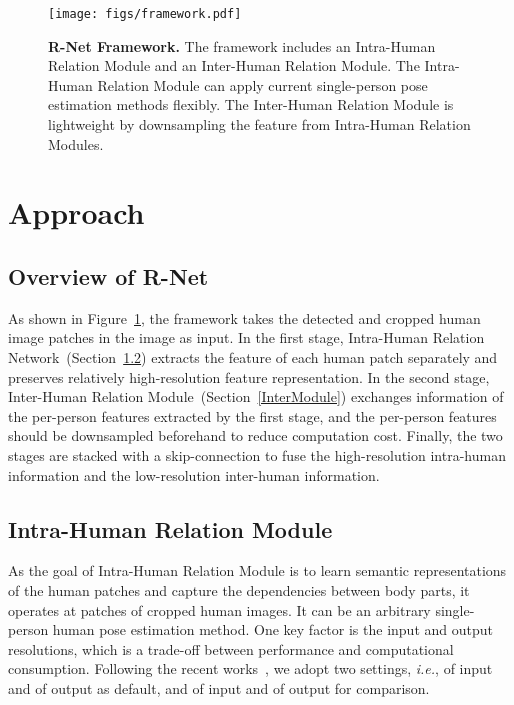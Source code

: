 \documentclass{article}
\begin{document}
\begin{figure}[t]
 \centering
    \texttt{[image: figs/framework.pdf]}
  \caption{\textbf{R-Net Framework.} The framework includes an Intra-Human Relation Module and an Inter-Human Relation Module. The Intra-Human Relation Module can apply current single-person pose estimation methods flexibly. The Inter-Human Relation Module is lightweight by downsampling the feature from Intra-Human Relation Modules.} 
  \label{framework}
\end{figure}



\section{Approach}


\subsection{Overview of R-Net}

As shown in Figure~\ref{framework}, the framework takes the detected and cropped human image patches in the image as input. In the first stage, Intra-Human Relation Network~(Section~\ref{IntraModule}) extracts the feature of each human patch separately and preserves relatively high-resolution feature representation. In the second stage, Inter-Human Relation Module~(Section~\ref{InterModule}) exchanges information of the per-person features extracted by the first stage, and the per-person features should be downsampled beforehand to reduce computation cost. Finally, the two stages are stacked with a skip-connection to fuse the high-resolution intra-human information and the low-resolution inter-human information.

\subsection{Intra-Human Relation Module}\label{IntraModule}
As the goal of Intra-Human Relation Module is to learn semantic representations of the human patches and capture the dependencies between body parts, it operates at patches of cropped human images. It can be an arbitrary single-person human pose estimation method. One key factor is the input and output resolutions, which is a trade-off between performance and computational consumption. Following the recent works~\cite{yang2021transpose,YuanFHLZCW21}, we adopt two settings, \emph{i.e.},  of input and  of output as default, and  of input and  of output for comparison.
\end{document}
